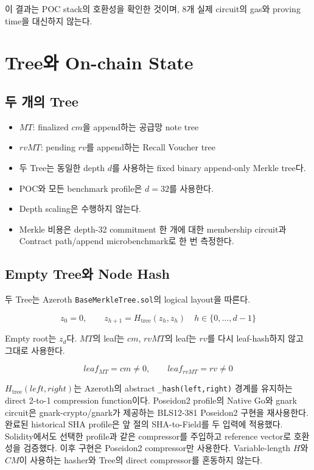 \documentclass[11pt,a4paper]{extarticle}
\begin{document}
이 결과는 POC stack의 호환성을 확인한 것이며, 8개 실제 circuit의 gas와 proving time을
대신하지 않는다.

\section{Tree와 On-chain State}

\subsection{두 개의 Tree}

\begin{itemize}
  \item $MT$: finalized $cm$을 append하는 공급망 note tree
  \item $rvMT$: pending $rv$를 append하는 Recall Voucher tree
  \item 두 Tree는 동일한 depth $d$를 사용하는 fixed binary append-only Merkle tree다.
  \item POC와 모든 benchmark profile은 $d=32$를 사용한다.
  \item Depth scaling은 수행하지 않는다.
  \item Merkle 비용은 depth-32 commitment 한 개에 대한 membership circuit과
        Contract path/append microbenchmark로 한 번 측정한다.
\end{itemize}

\subsection{Empty Tree와 Node Hash}

두 Tree는 Azeroth \texttt{BaseMerkleTree.sol}의 logical layout을 따른다.

\[
z_0=0,
\qquad
z_{h+1}=H_{\mathrm{tree}}(z_h,z_h)
\quad h\in\{0,\ldots,d-1\}
\]

Empty root는 $z_d$다. $MT$의 leaf는 $cm$, $rvMT$의 leaf는 $rv$를 다시
leaf-hash하지 않고 그대로 사용한다.

\[
leaf_{MT}=cm\neq0,
\qquad
leaf_{rvMT}=rv\neq0
\]

$H_{\mathrm{tree}}(left,right)$는 Azeroth의 abstract \texttt{\_hash(left,right)}
경계를 유지하는 direct 2-to-1 compression function이다. Poseidon2 profile의 Native Go와
gnark circuit은 gnark-crypto/gnark가 제공하는 BLS12-381 Poseidon2 구현을 재사용한다.
완료된 historical SHA profile은 앞 절의 SHA-to-Field를 두 입력에 적용했다. Solidity에서도
선택한 profile과 같은 compressor를 주입하고 reference vector로 호환성을 검증했다.
이후 구현은 Poseidon2 compressor만 사용한다. Variable-length $H$와
$CM$이 사용하는 hasher와 Tree의 direct compressor를 혼동하지 않는다.
\end{document}

